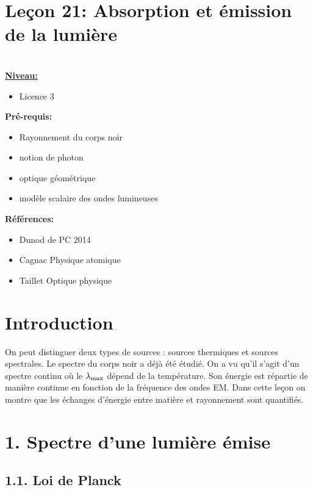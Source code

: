 \documentclass[french, a4paper, 10pt, twocolumn, landscape]{article}
\begin{document}
\section*{Leçon 21: Absorption et émission de la lumière}

\hrulefill\\

\noindent\underline{\textbf{Niveau:}} 
\begin{itemize}
    \item Licence 3
\end{itemize}

\textbf{Pré-requis:}
\begin{itemize}
    \item  Rayonnement du corps noir
    \item notion de photon
    \item optique géométrique
    \item modèle scalaire des ondes lumineuses
\end{itemize}

\textbf{Références:}\medskip

\begin{itemize}
\item Dunod de PC 2014
\item Cagnac Physique atomique
\item Taillet Optique physique
\end{itemize}

\hrulefill


\section*{Introduction}

On peut distinguer deux types de sources : sources thermiques et sources spectrales. Le spectre du corps noir a déjà été étudié. On a vu qu'il s'agit d'un spectre continu où le $\lambda_{\rm max}$ dépend de la température. Son énergie est répartie de manière continue en fonction de la fréquence des ondes EM. Dans cette leçon on montre que les échanges d'énergie entre matière et rayonnement sont quantifiés.

\section*{1. Spectre d'une lumière émise}

\subsection*{1.1. Loi de Planck}
\end{document}
